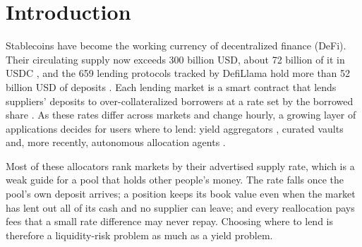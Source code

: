 \documentclass[sigconf]{acmart}
\begin{document}

\maketitle


\section{Introduction}
\label{sec:intro}

Stablecoins have become the working currency of decentralized finance (DeFi). Their circulating supply now exceeds 300 billion USD, about 72 billion of it in USDC \citep{defillamastable}, and the 659 lending protocols tracked by DefiLlama hold more than 52 billion USD of deposits \citep{defillamalending}. Each lending market is a smart contract that lends suppliers' deposits to over-collateralized borrowers at a rate set by the borrowed share \citep{gudgeon2020defi,aaveirm}. As these rates differ across markets and change hourly, a growing layer of applications decides for users where to lend: yield aggregators \citep{cousaert2022sok}, curated vaults \citep{metamorpho,eulerhandbook} and, more recently, autonomous allocation agents \citep{ysselection,zyftreasury,mamohow}.

Most of these allocators rank markets by their advertised supply rate, which is a weak guide for a pool that holds other people's money. The rate falls once the pool's own deposit arrives; a position keeps its book value even when the market has lent out all of its cash and no supplier can leave; and every reallocation pays fees that a small rate difference may never repay. Choosing where to lend is therefore a liquidity-risk problem as much as a yield problem.
\end{document}
